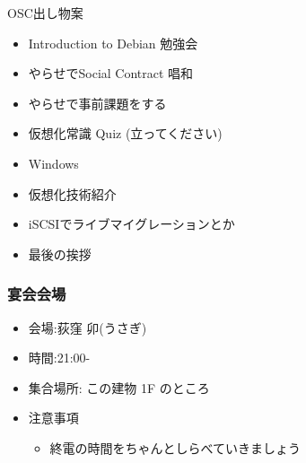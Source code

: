 \documentclass[cjk,dvipdfmx]{beamer}
\begin{document}
\begin{frame}{OSC出し物案}
\begin{minipage}[t]{0.4\hsize}
\begin{itemize}
 \item Introduction to Debian 勉強会
 \item やらせでSocial Contract 唱和
 \item やらせで事前課題をする
 \item 仮想化常識 Quiz (立ってください)
\end{itemize}
\end{minipage}
\begin{minipage}[t]{0.4\hsize}
\begin{itemize}
 \item Windows
 \item 仮想化技術紹介
 \item iSCSIでライブマイグレーションとか
 \item 最後の挨拶
\end{itemize}
\end{minipage}
\end{frame}

\begin{frame}
 \frametitle{宴会会場}
 \begin{itemize}
  \item 会場:荻窪 卯(うさぎ)
  \item 時間:21:00-
  \item 集合場所: この建物 1F のところ
  \item 注意事項
	\begin{itemize}
	 \item 終電の時間をちゃんとしらべていきましょう
	\end{itemize}
 \end{itemize}
\end{frame}
\end{document}
